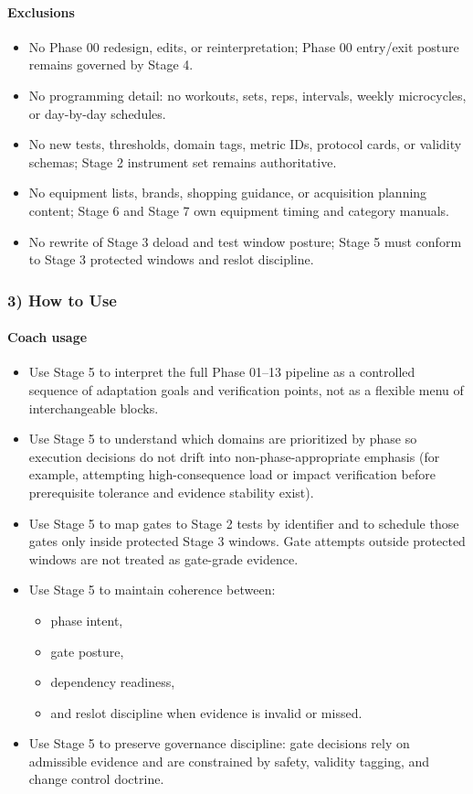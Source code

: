 \documentclass[10pt]{article}
\begin{document}
\paragraph*{Exclusions}

\begin{itemize}
\item No Phase 00 redesign, edits, or reinterpretation; Phase 00 entry/exit posture remains governed by Stage 4.
\item No programming detail: no workouts, sets, reps, intervals, weekly microcycles, or day-by-day schedules.
\item No new tests, thresholds, domain tags, metric IDs, protocol cards, or validity schemas; Stage 2 instrument set remains authoritative.
\item No equipment lists, brands, shopping guidance, or acquisition planning content; Stage 6 and Stage 7 own equipment timing and category manuals.
\item No rewrite of Stage 3 deload and test window posture; Stage 5 must conform to Stage 3 protected windows and reslot discipline.
\end{itemize}

\subsubsection*{3) How to Use}

\paragraph*{Coach usage}

\begin{itemize}
\item Use Stage 5 to interpret the full Phase 01–13 pipeline as a controlled sequence of adaptation goals and verification points, not as a flexible menu of interchangeable blocks.
\item Use Stage 5 to understand which domains are prioritized by phase so execution decisions do not drift into non-phase-appropriate emphasis (for example, attempting high-consequence load or impact verification before prerequisite tolerance and evidence stability exist).
\item Use Stage 5 to map gates to Stage 2 tests by identifier and to schedule those gates only inside protected Stage 3 windows. Gate attempts outside protected windows are not treated as gate-grade evidence.
\item Use Stage 5 to maintain coherence between:
  \begin{itemize}
  \item phase intent,
  \item gate posture,
  \item dependency readiness,
  \item and reslot discipline when evidence is invalid or missed.
  \end{itemize}
\item Use Stage 5 to preserve governance discipline: gate decisions rely on admissible evidence and are constrained by safety, validity tagging, and change control doctrine.
\end{itemize}
\end{document}
